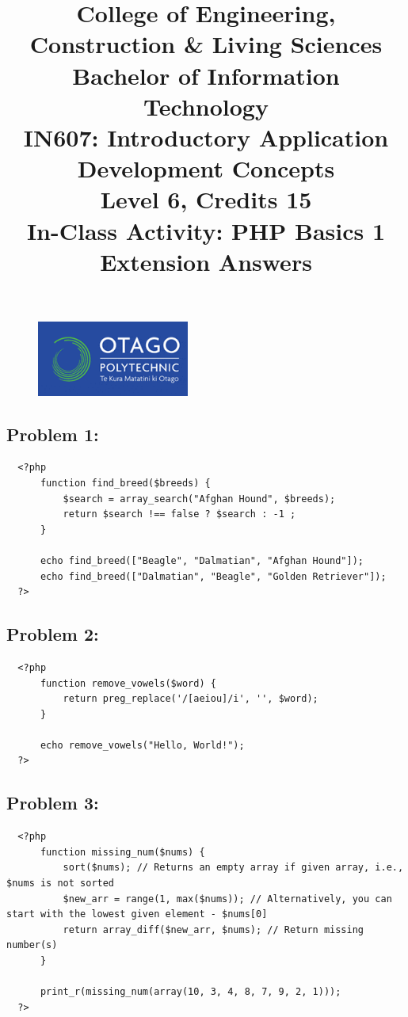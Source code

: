 \documentclass{article}
\author{}
\begin{document}
\begin{figure}
    \centering
    \includegraphics[width=50mm]{../img/logo.png}
\end{figure}

\title{College of Engineering, Construction \& Living Sciences\\Bachelor of Information Technology\\IN607: Introductory Application Development Concepts\\Level 6, Credits 15\\\textbf{In-Class Activity: PHP Basics 1 Extension Answers}}
\date{}
\maketitle
 
\subsection*{Problem 1:} 
\begin{verbatim}
  <?php
      function find_breed($breeds) {
          $search = array_search("Afghan Hound", $breeds);
          return $search !== false ? $search : -1 ;	
      }

      echo find_breed(["Beagle", "Dalmatian", "Afghan Hound"]);
      echo find_breed(["Dalmatian", "Beagle", "Golden Retriever"]);
  ?>
\end{verbatim}

\subsection*{Problem 2:} 
\begin{verbatim}
  <?php
      function remove_vowels($word) {
          return preg_replace('/[aeiou]/i', '', $word);
      }

      echo remove_vowels("Hello, World!");
  ?>
\end{verbatim}

\subsection*{Problem 3:} 
\begin{verbatim}
  <?php
      function missing_num($nums) {
          sort($nums); // Returns an empty array if given array, i.e., $nums is not sorted
          $new_arr = range(1, max($nums)); // Alternatively, you can start with the lowest given element - $nums[0]                                                
          return array_diff($new_arr, $nums); // Return missing number(s)
      }
        
      print_r(missing_num(array(10, 3, 4, 8, 7, 9, 2, 1)));
  ?>
\end{verbatim}
\end{document}
